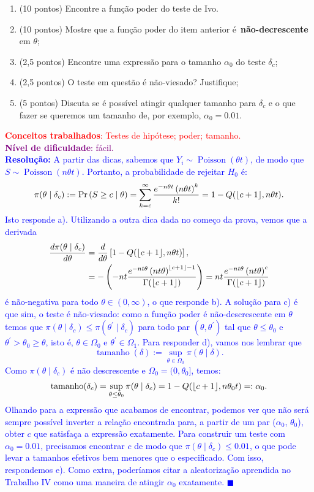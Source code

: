 \documentclass[a4paper,10pt, notitlepage]{report}
\newcommand{\pr}{\operatorname{Pr}} %
\DeclarePairedDelimiter\floor{\lfloor}{\rfloor}
\begin{document}
\begin{enumerate}[label=\alph*)]
 \item (10 pontos) Encontre a função poder do teste de Ivo.
 \item (10 pontos) Mostre que a função poder do item anterior é~\textbf{não-decrescente} em $\theta$;
 \item (2,5 pontos) Encontre uma expressão para o tamanho $\alpha_0$ do teste $\delta_c$;
 \item (2,5 pontos) O teste em questão é não-viesado? Justifique;
 \item (5 pontos) Discuta se é possível atingir qualquer tamanho para $\delta_c$ e o que fazer se queremos um tamanho de, por exemplo, $\alpha_0 = 0.01$.
\end{enumerate}
\textcolor{red}{\textbf{Conceitos trabalhados}: Testes de hipótese; poder; tamanho.}\\ \textcolor{purple}{\textbf{Nível de dificuldade}: fácil.}\\
\textcolor{blue}{
\textbf{Resolução:}
A partir das dicas, sabemos que $Y_i \sim\operatorname{Poisson}(\theta t)$, de modo que $S \sim\operatorname{Poisson}(n\theta t)$.
Portanto, a probabilidade de rejeitar $H_0$ é:
$$\pi(\theta \mid \delta_c) := \pr\left(S \geq c \mid \theta \right) = \sum_{k=c}^\infty \frac{e^{-n\theta t} \left(n\theta t\right)^k}{k!} = 1 - Q(\floor*{c + 1}, n\theta t).$$
Isto responde a).
Utilizando a outra dica dada no começo da prova, vemos que  a derivada
\begin{align*}
 \frac{d\pi(\theta \mid \delta_c)}{d\theta} &= \frac{d}{d\theta} \left[1 - Q(\floor*{c + 1}, n\theta t)\right],\\
 &= -\left(-nt\frac{e^{-nt\theta}\left(nt\theta\right)^{\floor*{c+1}-1}}{\Gamma(\floor*{c + 1})}\right) = nt\frac{e^{-nt\theta}\left(nt\theta\right)^{c}}{\Gamma(\floor*{c + 1})}
\end{align*}
é não-negativa para todo $\theta \in (0, \infty)$, o que responde b).
A solução para c) é que sim, o teste é não-viesado: como a função poder é não-descrescente em $\theta$ temos que $\pi(\theta \mid \delta_c) \leq \pi(\theta^\prime \mid \delta_c)$ para todo par $(\theta, \theta^\prime)$ tal que $\theta \leq \theta_0$ e $\theta^\prime > \theta_0 \geq \theta$, isto é, $\theta \in \Omega_0$ e $\theta^\prime \in \Omega_1$.
Para responder d), vamos nos lembrar que 
$$\operatorname{tamanho}(\delta) := \sup_{\theta \in \Omega_0} \pi(\theta \mid \delta).$$
Como $\pi(\theta \mid \delta_c)$ é não descrescente e $\Omega_0 = (0, \theta_0]$, temos:
$$\operatorname{tamanho}(\delta_c) = \sup_{\theta \leq \theta_0} \pi(\theta \mid \delta_c) = 1-Q(\floor*{c + 1}, n\theta_0t) =: \alpha_0.$$
Olhando para a expressão que acabamos de encontrar, podemos ver que não será sempre possível inverter a relação encontrada para, a partir de um par ($\alpha_0$, $\theta_0$), obter $c$ que satisfaça a expressão exatamente.
Para construir um teste com $\alpha_0 = 0.01$, precisamos encontrar $c$ de modo que $\pi(\theta \mid \delta_c) \leq 0.01$, o que pode levar a tamanhos efetivos bem menores que o especificado.
Com isso, respondemos e).
Como extra, poderíamos citar a aleatorização aprendida no Trabalho IV como uma maneira de atingir $\alpha_0$ exatamente.
$\blacksquare$
}
\end{document}

